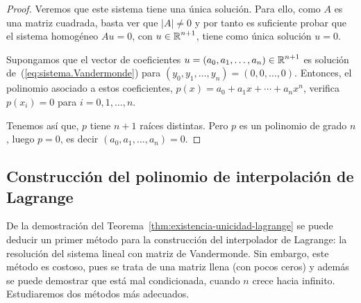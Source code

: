 \begin{proof}
    Veremos que
  este sistema tiene una única solución. Para ello, como $A$ es una
  matriz cuadrada, basta ver que $|A|\neq 0$ y por tanto es suficiente
  probar que el sistema homogéneo $Au=0$, con $u\in\operatorname{{\mathbb R}}^{n+1}$, tiene
  como única solución $u=0$.

  Supongamos que el vector de coeficientes
  $u=(a_0,a_1,\dots,a_n) \in\operatorname{{\mathbb R}}^{n+1}$ es solución
  de~(\ref{eq:sistema.Vandermonde}) para
  $(y_0,y_1,\dots,y_n)=(0,0,\dots,0)$. Entonces, el polinomio
  asociado a estos coeficientes,
  $p(x)=a_0 + a_1x + \cdots + a_n x^n$, verifica $p(x_i)=0$ para
  $i=0,1,\dots,n$.

  Tenemos así que, $p$ tiene $n+1$ raíces distintas. Pero
  $p$ es un polinomio de grado $n$, luego $p=0$, es decir
  $(a_0,a_1,\dots,a_n)=0$.
\end{proof}


\subsection{Construcción del polinomio de interpolación de Lagrange}
\label{sec:construcion--polinomio-lagrange}

De la demostración del Teorema~\ref{thm:existencia-unicidad-lagrange}
se puede deducir un primer método para la construcción del
interpolador de Lagrange: la resolución del sistema lineal con matriz
de Vandermonde. Sin embargo, este método es costoso, pues se trata de
una matriz llena (con pocos ceros) y además se puede demostrar que
está mal condicionada, cuando $n$ crece hacia infinito. Estudiaremos
dos métodos más adecuados.

